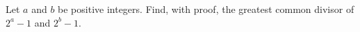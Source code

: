 Let $a$ and $b$ be positive integers. Find, with proof, the greatest common divisor of $2^a-1$ and $2^b-1$.
